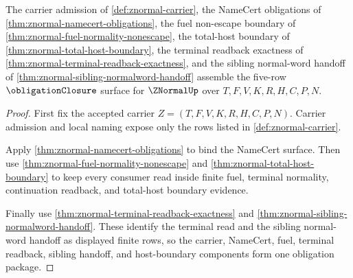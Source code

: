 \begin{theorem}
\label{thm:znormal-obligation-closure-package}
The carrier admission of \autoref{def:znormal-carrier}, the NameCert obligations of \autoref{thm:znormal-namecert-obligations}, the fuel non-escape boundary of \autoref{thm:znormal-fuel-normality-nonescape}, the total-host boundary of \autoref{thm:znormal-total-host-boundary}, the terminal readback exactness of \autoref{thm:znormal-terminal-readback-exactness}, and the sibling normal-word handoff of \autoref{thm:znormal-sibling-normalword-handoff} assemble the five-row $\obligationClosure$ surface for $\ZNormalUp$ over $T,F,V,K,R,H,C,P,N$.
\end{theorem}
\begin{proof}
First fix the accepted carrier $Z=(T,F,V,K,R,H,C,P,N)$. Carrier admission and local naming expose only the rows listed in \autoref{def:znormal-carrier}.

Apply \autoref{thm:znormal-namecert-obligations} to bind the NameCert surface. Then use \autoref{thm:znormal-fuel-normality-nonescape} and \autoref{thm:znormal-total-host-boundary} to keep every consumer read inside finite fuel, terminal normality, continuation readback, and total-host boundary evidence.

Finally use \autoref{thm:znormal-terminal-readback-exactness} and \autoref{thm:znormal-sibling-normalword-handoff}. These identify the terminal read and the sibling normal-word handoff as displayed finite rows, so the carrier, NameCert, fuel, terminal readback, sibling handoff, and host-boundary components form one obligation package.
\end{proof}

